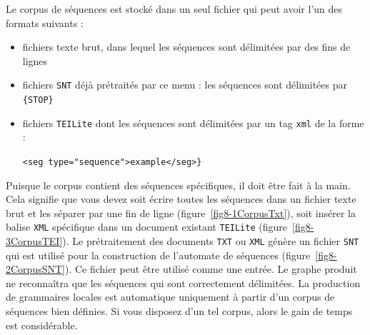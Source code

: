 Le corpus de séquences est stocké dans un seul fichier qui peut avoir l'un des formats suivants :
\begin{itemize}
\item fichiers texte brut, dans lequel les séquences sont délimitées par des fins de lignes
\item fichiers \verb+SNT+ déjà prétraités par ce menu : les séquences sont délimitées
		par \verb+{STOP}+
\item fichiers \verb+TEILite+ dont les séquences sont délimitées par un tag \verb+xml+ de la
		forme :

		\verb+<seg type="sequence">example</seg>}+
\end{itemize}
\pagebreak 
\indent Puisque le corpus contient des séquences spécifiques, il doit être fait à la main.
Cela signifie que vous devez soit écrire toutes les séquences dans un fichier texte brut et les
séparer par une fin de ligne (figure~\ref{fig8-1CorpusTxt}), soit insérer la balise \verb+XML+
spécifique dans un document existant \verb+TEILite+ (figure~\ref{fig8-3CorpusTEI}). Le prétraitement
des documents \verb+TXT+ ou \verb+XML+ génère un fichier \verb+SNT+ qui est utilisé pour la
construction de l'automate de séquences (figure~\ref{fig8-2CorpusSNT}). Ce fichier peut être utilisé
comme une entrée. Le graphe produit ne reconnaîtra que les séquences qui sont correctement
délimitées. La production de grammaires locales est automatique uniquement à partir d'un corpus de
séquences bien définies. Si vous disposez d'un tel corpus, alors le gain de temps est considérable.

